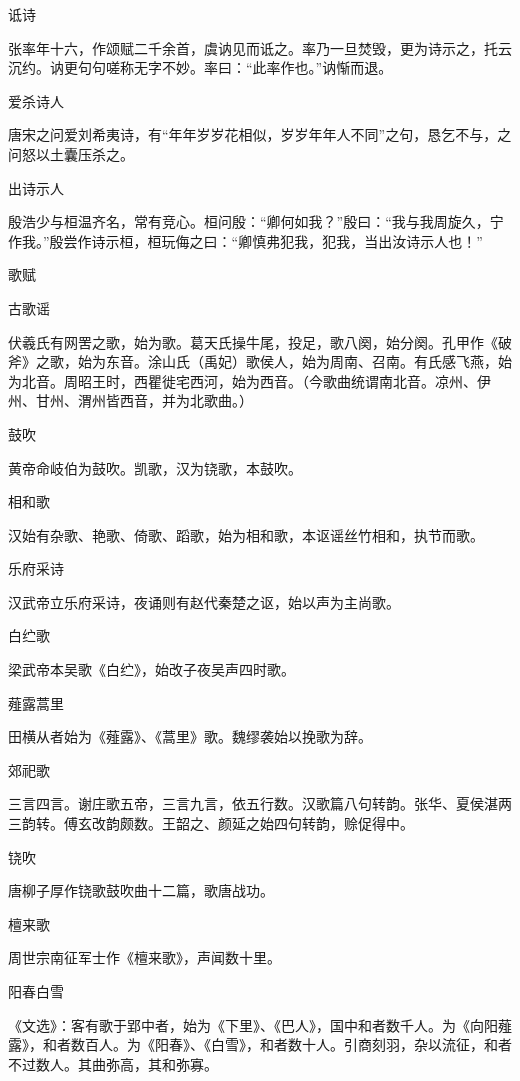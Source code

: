 \documentclass[a4paper,12pt,UTF8,twoside]{ctexbook}
\begin{document}
    诋诗
    
    张率年十六，作颂赋二千余首，虞讷见而诋之。率乃一旦焚毁，更为诗示之，托云沉约。讷更句句嗟称无字不妙。率曰：“此率作也。”讷惭而退。
    
    爱杀诗人
    
    唐宋之问爱刘希夷诗，有“年年岁岁花相似，岁岁年年人不同”之句，恳乞不与，之问怒以土囊压杀之。
    
    出诗示人
    
    殷浩少与桓温齐名，常有竞心。桓问殷：“卿何如我？”殷曰：“我与我周旋久，宁作我。”殷尝作诗示桓，桓玩侮之曰：“卿慎弗犯我，犯我，当出汝诗示人也！”
    
    歌赋
    
    古歌谣
    
    伏羲氏有网罟之歌，始为歌。葛天氏操牛尾，投足，歌八阕，始分阕。孔甲作《破斧》之歌，始为东音。涂山氏（禹妃）歌侯人，始为周南、召南。有氏感飞燕，始为北音。周昭王时，西瞿徙宅西河，始为西音。（今歌曲统谓南北音。凉州、伊州、甘州、渭州皆西音，并为北歌曲。）
    
    鼓吹
    
    黄帝命岐伯为鼓吹。凯歌，汉为铙歌，本鼓吹。
    
    相和歌
    
    汉始有杂歌、艳歌、倚歌、蹈歌，始为相和歌，本讴谣丝竹相和，执节而歌。
    
    乐府采诗
    
    汉武帝立乐府采诗，夜诵则有赵代秦楚之讴，始以声为主尚歌。
    
    白纻歌
    
    梁武帝本吴歌《白纻》，始改子夜吴声四时歌。
    
    薤露蒿里
    
    田横从者始为《薤露》、《蒿里》歌。魏缪袭始以挽歌为辞。
    
    郊祀歌
    
    三言四言。谢庄歌五帝，三言九言，依五行数。汉歌篇八句转韵。张华、夏侯湛两三韵转。傅玄改韵颇数。王韶之、颜延之始四句转韵，赊促得中。
    
    铙吹
    
    唐柳子厚作铙歌鼓吹曲十二篇，歌唐战功。
    
    檀来歌
    
    周世宗南征军士作《檀来歌》，声闻数十里。
    
    阳春白雪
    
    《文选》：客有歌于郢中者，始为《下里》、《巴人》，国中和者数千人。为《向阳薤露》，和者数百人。为《阳春》、《白雪》，和者数十人。引商刻羽，杂以流征，和者不过数人。其曲弥高，其和弥寡。
    
\end{document}
